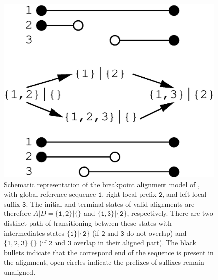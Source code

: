 \documentclass[a4paper,10pt]{article}
\begin{document}
\begin{figure}
  \begin{center}
    \includegraphics[width=0.9\columnwidth]{Fig1.eps}
  \end{center}
  \caption{Schematic representation of the breakpoint alignment model of
    \cite{AlArab:17a}, with global reference sequence $\mathtt{1}$,
    right-local prefix $\mathtt{2}$, and left-local suffix $\mathtt{3}$.
    The initial and terminal states of valid alignments are therefore
    $A|D=\{\mathtt{1},\mathtt{2}\}|\{\}$ and
    $\{\mathtt{1},\mathtt{3}\}|\{\mathtt{2}\}$, respectively.  There are
    two distinct path of transitioning between these states with
    intermediates states $\{\mathtt{1}\}|\{\mathtt{2}\}$ (if $\mathtt{2}$
    and $\mathtt{3}$ do not overlap) and $\{\mathtt{1,2,3}\}|\{\}$ (if
    $\mathtt{2}$ and $\mathtt{3}$ overlap in their aligned part). The black
    bullets indicate that the correspond end of the sequence is present in
    the alignment, open circles indicate the prefixes of suffixes remain
    unaligned.}
  \label{fig:Marwa}
\end{figure}
\end{document}
